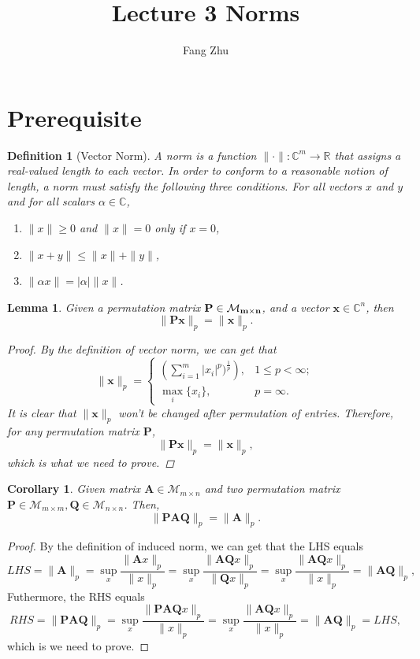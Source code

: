 \documentclass{article}
\author{Fang Zhu}
\title{Lecture 3 Norms}
\newtheorem{definition}{Definition}[section]
\newtheorem{corollary}{Corollary}[section]
\newtheorem{lemma}{Lemma}[section]
\begin{document}
	\maketitle
	
\section{Prerequisite}
\begin{definition}[Vector Norm]
    A \textit{norm} is a function $\| \cdot \|: \mathbb{C}^{m} \to \mathbb{R}$ that assigns a real-valued length to each vector. In order to conform to a reasonable notion of length, a norm must 
    satisfy the following three conditions. For all vectors $x$ and $y$ and for all scalars $\alpha \in \mathbb{C}$,
    \begin{enumerate}
        \item[(1)] $\| x \| \geq 0$ and $\| x \| = 0$ only if $x = 0$,
        \item[(2)] $\| x + y\| \leq \| x\| + \| y\|$,
        \item[(3)] $\| \alpha x \| = |\alpha| \|x\|$.
    \end{enumerate}
\end{definition}
\begin{lemma}
Given a permutation matrix $\bf{P} \in \mathcal{M}_{m \times n}$, and a vector $\bm{x} \in \mathbb{C}^{n}$, then 
$$
    \|\bm{Px} \|_p = \|\bm{x} \|_p.
$$
\begin{proof} 
By the definition of vector norm, we can get that
$$
\|\bm{x}\|_p = \begin{cases}
\left(\sum_{i=1}^{m} |x_i|^{p})^{\frac{1}{p}}\right), & 1\leq p < \infty; \\
\max_{i} \{ x_i \}, & p = \infty .
\end{cases}
$$
It is clear that $\| \bm{x} \|_p$ won't be changed after permutation of entries. Therefore, for any permutation matrix $\bm{P}$,
$$
    \|\bm{Px} \|_p  = \|\bm{x} \|_p,
$$
which is what we need to prove.
\end{proof}
\end{lemma}

\begin{corollary}
Given matrix $\bm{A} \in \mathcal{M}_{m\times n} $ and two permutation matrix $\bm{P} \in \mathcal{M}_{m \times m}, \bm{Q} \in \mathcal{M}_{n \times n}$. Then,
$$
\| \bm{PAQ}\|_{p} = \|  \bm{A} \|_{p}.
$$
\end{corollary}

\begin{proof}
    By the definition of induced norm, we can get that the LHS equals
    $$
    LHS = \|\bm{A}\|_p = \sup_{x} \frac{\| \bm{A} x\|_p}{\|x\|_p} =  \sup_{x} \frac{\|\bm{AQ} x \|_p}{\|\bm{Q} x\|_p} = \sup_{x} \frac{\|\bm{AQ} x \|_p}{\|x\|_p} = \| \bm{AQ} \|_p,
    $$
    Futhermore, the RHS equals
    $$
    RHS = \| \bm{PAQ}\|_p = \sup_{x} \frac{\|\bm{PAQ} x\|_p}{\|x\|_p} = \sup_{x} \frac{\| \bm{AQ}x \|_p}{\|x \|_p} = \| \bm{AQ}\|_p = LHS,
    $$
    which is we need to prove.
\end{proof}
\end{document}
